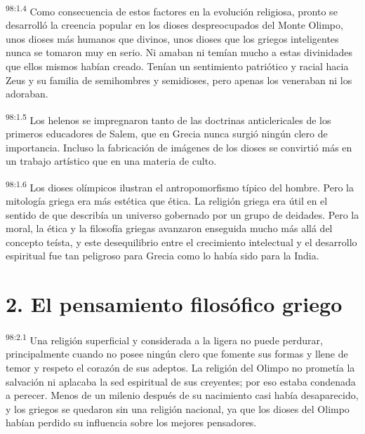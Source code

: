 \par
\textsuperscript{98:1.4} Como consecuencia de estos factores en la evolución religiosa, pronto se desarrolló la creencia popular en los dioses despreocupados del Monte Olimpo, unos dioses más humanos que divinos, unos dioses que los griegos inteligentes nunca se tomaron muy en serio. Ni amaban ni temían mucho a estas divinidades que ellos mismos habían creado. Tenían un sentimiento patriótico y racial hacia Zeus y su familia de semihombres y semidioses, pero apenas los veneraban ni los adoraban.

\par
\textsuperscript{98:1.5} Los helenos se impregnaron tanto de las doctrinas anticlericales de los primeros educadores de Salem, que en Grecia nunca surgió ningún clero de importancia. Incluso la fabricación de imágenes de los dioses se convirtió más en un trabajo artístico que en una materia de culto.

\par
\textsuperscript{98:1.6} Los dioses olímpicos ilustran el antropomorfismo típico del hombre. Pero la mitología griega era más estética que ética. La religión griega era útil en el sentido de que describía un universo gobernado por un grupo de deidades. Pero la moral, la ética y la filosofía griegas avanzaron enseguida mucho más allá del concepto teísta, y este desequilibrio entre el crecimiento intelectual y el desarrollo espiritual fue tan peligroso para Grecia como lo había sido para la India.

\section*{2. El pensamiento filosófico griego}
\par
\textsuperscript{98:2.1} Una religión superficial y considerada a la ligera no puede perdurar, principalmente cuando no posee ningún clero que fomente sus formas y llene de temor y respeto el corazón de sus adeptos. La religión del Olimpo no prometía la salvación ni aplacaba la sed espiritual de sus creyentes; por eso estaba condenada a perecer. Menos de un milenio después de su nacimiento casi había desaparecido, y los griegos se quedaron sin una religión nacional, ya que los dioses del Olimpo habían perdido su influencia sobre los mejores pensadores.

